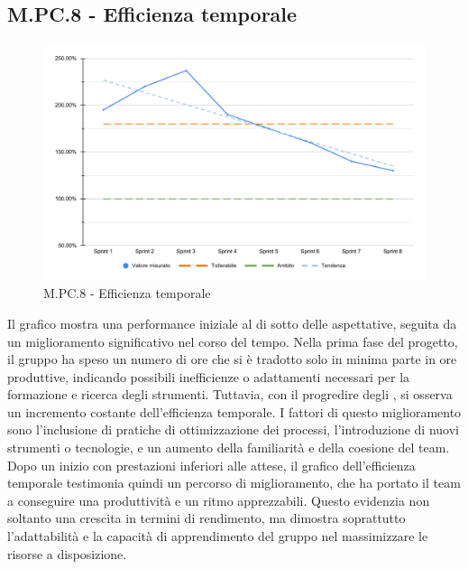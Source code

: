 \subsection{M.PC.8 - Efficienza temporale}
\begin{figure}[H]
    \centering
    \includegraphics[width=\textwidth]{assets/efficienza_temporale.pdf}
    \caption{M.PC.8 - Efficienza temporale}
\end{figure}

\par Il grafico mostra una performance iniziale al di sotto delle aspettative, seguita da un miglioramento significativo nel corso del tempo. Nella prima fase del progetto, il gruppo ha speso un numero di ore che si è tradotto solo in minima parte in ore produttive, indicando possibili inefficienze o adattamenti necessari per la formazione e ricerca degli strumenti. Tuttavia, con il progredire degli , si osserva un incremento costante dell'efficienza temporale. I fattori di questo miglioramento sono l'inclusione di pratiche di ottimizzazione dei processi, l'introduzione di nuovi strumenti o tecnologie, e un aumento della familiarità e della coesione del team.
Dopo un inizio con prestazioni inferiori alle attese, il grafico dell'efficienza temporale testimonia quindi un percorso di miglioramento, che ha portato il team a conseguire una produttività e un ritmo apprezzabili. Questo evidenzia non soltanto una crescita in termini di rendimento, ma dimostra soprattutto l'adattabilità e la capacità di apprendimento del gruppo nel massimizzare le risorse a disposizione.
